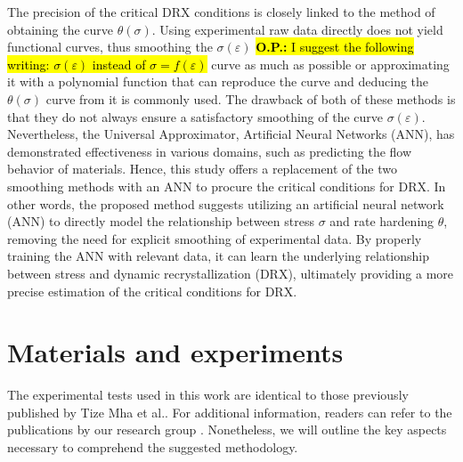 \documentclass[metals,article,submit,pdftex,moreauthors]{Definitions/mdpi}
\makeatletter
\DeclareRobustCommand{\eal}{et al.\@\xspace}
\DeclareRobustCommand{\OP}[1]{\begingroup\sethlcolor{VWyellow}\textcolor{red}{\hl{\textbf{O.P.:} #1}}\endgroup}
\makeatother
\begin{document}
The precision of the critical DRX conditions is closely linked to the method of obtaining the curve $\theta(\sigma)$.
Using experimental raw data directly does not yield functional curves, thus smoothing the $\sigma(\varepsilon)$ \OP{I suggest the following writing: $\sigma(\varepsilon)$ instead of $\sigma=f(\varepsilon)$} curve as much as possible or approximating it with a polynomial function that can reproduce the curve and deducing the $\theta(\sigma)$ curve from it is commonly used.
The drawback of both of these methods is that they do not always ensure a satisfactory smoothing of the curve $\sigma(\varepsilon)$.
Nevertheless, the Universal Approximator, Artificial Neural Networks (ANN), has demonstrated effectiveness in various domains, such as predicting the flow behavior of materials.
Hence, this study offers a replacement of the two smoothing methods with an ANN to procure the critical conditions for DRX.
In other words, the proposed method suggests utilizing an artificial neural network (ANN) to directly model the relationship between stress $\sigma$ and rate hardening $\theta$, removing the need for explicit smoothing of experimental data.
By properly training the ANN with relevant data, it can learn the underlying relationship between stress and dynamic recrystallization (DRX), ultimately providing a more precise estimation of the critical conditions for DRX.

\section{Materials and experiments\label{sec:MaterialsExperiments}}

The experimental tests used in this work are identical to those previously published by Tize Mha \eal \cite{TizeMha-2023}.
For additional information, readers can refer to the publications by our research group \cite{Pantale-2021, Pantale-2023}.
Nonetheless, we will outline the key aspects necessary to comprehend the suggested methodology.
\end{document}
